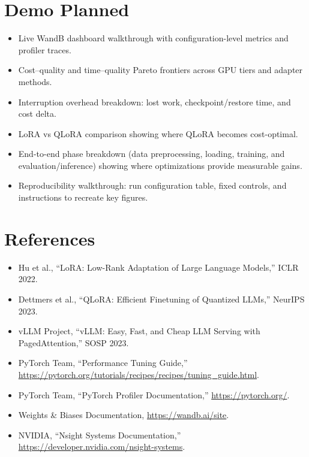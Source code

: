 \documentclass[10pt]{article}
\begin{document}
\section{Demo Planned}
\begin{itemize}
  \item Live WandB dashboard walkthrough with configuration-level metrics and profiler traces.
  \item Cost--quality and time--quality Pareto frontiers across GPU tiers and adapter methods.
  \item Interruption overhead breakdown: lost work, checkpoint/restore time, and cost delta.
  \item LoRA vs QLoRA comparison showing where QLoRA becomes cost-optimal.
  \item End-to-end phase breakdown (data preprocessing, loading, training, and evaluation/inference) showing where optimizations provide measurable gains.
  \item Reproducibility walkthrough: run configuration table, fixed controls, and instructions to recreate key figures.
\end{itemize}

\section{References}
\begin{itemize}
  \item Hu et al., ``LoRA: Low-Rank Adaptation of Large Language Models,'' ICLR 2022.
  \item Dettmers et al., ``QLoRA: Efficient Finetuning of Quantized LLMs,'' NeurIPS 2023.
  \item vLLM Project, ``vLLM: Easy, Fast, and Cheap LLM Serving with PagedAttention,'' SOSP 2023.
  \item PyTorch Team, ``Performance Tuning Guide,'' \url{https://pytorch.org/tutorials/recipes/recipes/tuning_guide.html}.
  \item PyTorch Team, ``PyTorch Profiler Documentation,'' \url{https://pytorch.org/}.
  \item Weights \& Biases Documentation, \url{https://wandb.ai/site}.
  \item NVIDIA, ``Nsight Systems Documentation,'' \url{https://developer.nvidia.com/nsight-systems}.
\end{itemize}
\end{document}
